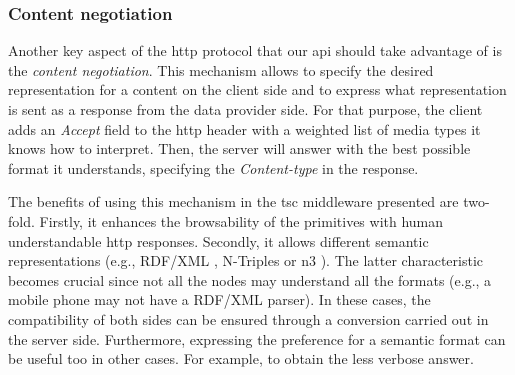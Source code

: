 \subsubsection{Content negotiation}
Another key aspect of the \acs{http} protocol that our \acs{api} should take advantage of is the \textit{content negotiation}.
This mechanism allows to specify the desired representation for a content on the client side and to express what representation is sent as a response from the data provider side.
For that purpose, the client adds an \textit{Accept} field to the \acs{http} header with a weighted list of media types it knows how to interpret.
Then, the server will answer with the best possible format it understands, specifying the \textit{Content-type} in the response.

The benefits of using this mechanism in the \ac{tsc} middleware presented are two-fold.
Firstly, it enhances the browsability of the primitives with human understandable \acs{http} responses. %
Secondly, it allows different semantic representations (e.g., RDF/XML , N-Triples  or \acs{n3} ).
The latter characteristic becomes crucial since not all the nodes may understand all the formats (e.g., a mobile phone may not have a RDF/XML parser).
In these cases, the compatibility of both sides can be ensured through a conversion carried out in the server side.
Furthermore, expressing the preference for a semantic format can be useful too in other cases.
For example, to obtain the less verbose answer.
